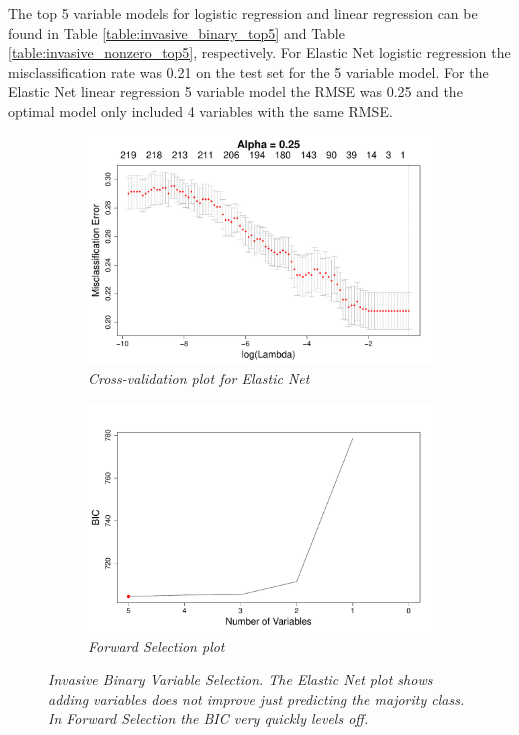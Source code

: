 \documentclass{article}
\begin{document}
\pagebreak

The top 5 variable models for logistic regression and linear regression can be found in Table \ref{table:invasive_binary_top5} 
and Table \ref{table:invasive_nonzero_top5}, respectively. For Elastic Net logistic regression the misclassification rate was 0.21 
on the test set for the 5 variable model. For the Elastic Net linear regression 5 variable model the RMSE was 0.25 and the optimal model only included 4 variables with the same RMSE.

\begin{figure}[h!]
\begin{subfigure}[b]{0.5\textwidth}
\includegraphics[width=\textwidth]{elastic_cv_invasive_binary.pdf}
\caption{\textsl{\small  Cross-validation plot for Elastic Net}}
\end{subfigure}
\hfill
\begin{subfigure}[b]{0.5\textwidth}
\includegraphics[width=\textwidth]{forward_nvars_invasive_binary.pdf}
\caption{\textsl{\small Forward Selection plot}}
\end{subfigure}
\caption{\textsl{\small Invasive Binary Variable Selection. The Elastic Net plot shows adding variables does not improve just predicting the majority class. In Forward Selection the BIC very quickly levels off.}}
\label{figure:invasive_binary_opt}
\end{figure}
\end{document}
